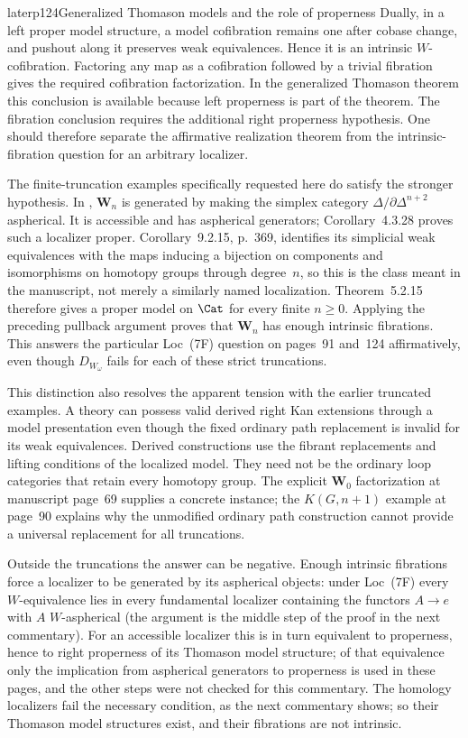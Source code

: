 \begin{dcomment}{later}{p124}{Generalized Thomason models and the role of properness}
Dually, in a left proper model structure, a model cofibration remains one after cobase change, and pushout along it preserves weak equivalences. Hence it is an intrinsic $W$-cofibration. Factoring any map as a cofibration followed by a trivial fibration gives the required cofibration factorization. In the generalized Thomason theorem this conclusion is available because left properness is part of the theorem. The fibration conclusion requires the additional right properness hypothesis. One should therefore separate the affirmative realization theorem from the intrinsic-fibration question for an arbitrary localizer.

The finite-truncation examples specifically requested here do satisfy the stronger hypothesis. In \citet[Section~9.2.1, p.~364]{Cisinski2006}, $\mathbf W_n$ is generated by making the simplex category $\Delta/\partial\Delta^{n+2}$ aspherical. It is accessible and has aspherical generators; Corollary~4.3.28 proves such a localizer proper. Corollary~9.2.15, p.~369, identifies its simplicial weak equivalences with the maps inducing a bijection on components and isomorphisms on homotopy groups through degree~$n$, so this is the class meant in the manuscript, not merely a similarly named localization. Theorem~5.2.15 therefore gives a proper model on $\Cat$ for every finite $n\geq0$. Applying the preceding pullback argument proves that $\mathbf W_n$ has enough intrinsic fibrations. This answers the particular Loc~(7F) question on pages~91 and~124 affirmatively, even though $D_{W_\omega}$ fails for each of these strict truncations.

This distinction also resolves the apparent tension with the earlier truncated examples. A theory can possess valid derived right Kan extensions through a model presentation even though the fixed ordinary path replacement is invalid for its weak equivalences. Derived constructions use the fibrant replacements and lifting conditions of the localized model. They need not be the ordinary loop categories that retain every homotopy group. The explicit $\mathbf W_0$ factorization at manuscript page~69 supplies a concrete instance; the $K(G,n+1)$ example at page~90 explains why the unmodified ordinary path construction cannot provide a universal replacement for all truncations.

Outside the truncations the answer can be negative. Enough intrinsic fibrations force a localizer to be generated by its aspherical objects: under Loc~(7F) every $W$-equivalence lies in every fundamental localizer containing the functors $A\to e$ with $A$ $W$-aspherical (the argument is the middle step of the proof in the next commentary). For an accessible localizer this is in turn equivalent to properness, hence to right properness of its Thomason model structure; of that equivalence only the implication from aspherical generators to properness \citep[Corollaire~4.3.28]{Cisinski2006} is used in these pages, and the other steps were not checked for this commentary. The homology localizers fail the necessary condition, as the next commentary shows; so their Thomason model structures exist, and their fibrations are not intrinsic.
\end{dcomment}

